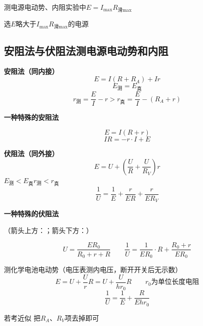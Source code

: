 测电源电动势、内阻实验中\qquad $E=I_{\max}R_{\text{滑}\max}$

选$E$略大于$I_{\max}R_{\text{滑}\max}$的电源

\subsection{安阻法与伏阻法测电源电动势和内阻}
\textbf{安阻法（同内接）}
\[
E=I(R+R_A)+Ir
\]
\[
E_{\text{测}}=E_{\text{真}}
\]
\[
r_{\text{测}}=\frac{E}{I}-r>r_{\text{真}}=\frac{E}{I}-(R_A+r)
\]

\textbf{一种特殊的安阻法}



\[ E=I(R+r) \]
\[ IR=-r\cdot I+E \]

\textbf{伏阻法（同外接）}
\[
E=U+\left(\frac{U}{R}+\frac{U}{R_V}\right)r
\]
$E_{\text{测}}<E_{\text{真}}$\qquad $r_{\text{测}}<r_{\text{真}}$
\[
\frac{1}{U}=\frac{1}{E}+\frac{r}{ER}+\frac{r}{ER_V}
\]

\textbf{一种特殊的伏阻法}


（箭头上方：；箭头下方：）

\[
U=\frac{E R_0}{R_0+r+R}
\qquad
\frac{1}{U}=\frac{1}{ER_0}\cdot R+\frac{R_0+r}{ER_0}
\]

测化学电池电动势（电压表测内电压，断开开关后无示数）
\[
E=U+\frac{U}{r}R=U+\frac{U}{hr_0}R\qquad r_0\text{为单位长度电阻}
\]
\[
\frac1U=\frac1E+\frac{R}{Ehr_0}
\]

若考近似 把$R_A$、$R_V$项去掉即可

